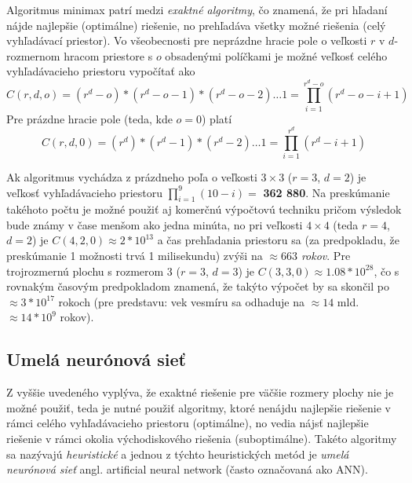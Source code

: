 Algoritmus minimax patrí medzi \emph{exaktné algoritmy}, čo znamená, že pri hľadaní nájde najlepšie (optimálne)
riešenie, no prehľadáva všetky možné riešenia (celý vyhľadávací priestor).
Vo všeobecnosti pre neprázdne hracie pole o veľkosti $r$ v $d$-rozmernom hracom priestore s $o$ obsadenými políčkami je
možné veľkosť celého vyhľadávacieho priestoru vypočítať ako
\begin{equation}
    C(r, d, o) = (r^d - o) * (r^d - o - 1) * (r^d - o - 2) \dots 1 = \prod_{i = 1}^{r^d - o}{(r^d - o - i + 1)}
\end{equation}
Pre prázdne hracie pole (teda, kde $o = 0$) platí
\begin{equation}
    C(r, d, 0) = (r^d) * (r^d - 1) * (r^d - 2) \dots 1 = \prod_{i = 1}^{r^d}{(r^d - i + 1)}
\end{equation}

Ak algoritmus vychádza z prázdneho poľa o veľkosti $3 \times 3$ ($r = 3$, $d = 2$) je veľkosť vyhľadávacieho priestoru
$\prod_{i = 1}^{9}{(10 - i)} =$ \textbf{362 880}.
Na preskúmanie takéhoto počtu je možné použiť aj komerčnú výpočtovú techniku pričom výsledok bude známy v čase menšom
ako jedna minúta, no pri veľkosti $4 \times 4$ (teda $r = 4$, $d = 2$) je $C(4, 2, 0) \approx 2*10^{13}$ a čas
prehľadania priestoru sa (za predpokladu, že preskúmanie 1 možnosti trvá 1 milisekundu) zvýši na
\emph{$\approx 663$ rokov}.
Pre trojrozmernú plochu s rozmerom $3$ ($r = 3$, $d = 3$) je $C(3, 3, 0) \approx 1.08 * 10^{28}$, čo s rovnakým časovým
predpokladom znamená, že takýto výpočet by sa skončil po $\approx 3*10^{17}$ rokoch (pre predstavu: vek vesmíru sa
odhaduje na $\approx 14$ mld. $\approx 14 * 10^9$ rokov).

\subsection{Umelá neurónová sieť}\label{subsec:algo-ann}

Z vyššie uvedeného vyplýva, že exaktné riešenie pre väčšie rozmery plochy nie je možné použiť, teda je nutné použiť
algoritmy, ktoré nenájdu najlepšie riešenie v rámci celého vyhľadávacieho priestoru (optimálne), no vedia nájsť
najlepšie riešenie v rámci okolia východiskového riešenia (suboptimálne).
Takéto algoritmy sa nazývajú \emph{heuristické} a jednou z týchto heuristických metód je \emph{umelá neurónová sieť}
angl. artificial neural network (často označovaná ako ANN).

